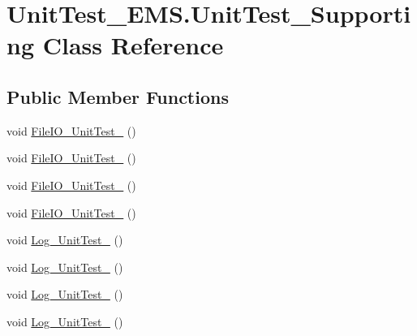 \hypertarget{class_unit_test___e_m_s_1_1_unit_test___supporting}{\section{Unit\-Test\-\_\-\-E\-M\-S.\-Unit\-Test\-\_\-\-Supporting Class Reference}
\label{class_unit_test___e_m_s_1_1_unit_test___supporting}
}
\subsection*{Public Member Functions}
\begin{DoxyCompactItemize}
\item 
void \hyperlink{class_unit_test___e_m_s_1_1_unit_test___supporting_a72211019064e1ba486f7f1fc700936d6}{File\-I\-O\-\_\-\-Unit\-Test\-\_} ()
\item 
void \hyperlink{class_unit_test___e_m_s_1_1_unit_test___supporting_ac55a01a9c7b6a2159bc66739143cae1a}{File\-I\-O\-\_\-\-Unit\-Test\-\_} ()
\item 
void \hyperlink{class_unit_test___e_m_s_1_1_unit_test___supporting_abb74bdd5723525afa1dbcfc1568cb8de}{File\-I\-O\-\_\-\-Unit\-Test\-\_} ()
\item 
void \hyperlink{class_unit_test___e_m_s_1_1_unit_test___supporting_a72d37bdf33fc43418c4d6570e5f23719}{File\-I\-O\-\_\-\-Unit\-Test\-\_} ()
\item 
void \hyperlink{class_unit_test___e_m_s_1_1_unit_test___supporting_af268ad94cc9b26f1f244f0792e6118de}{Log\-\_\-\-Unit\-Test\-\_} ()
\item 
void \hyperlink{class_unit_test___e_m_s_1_1_unit_test___supporting_a5114d1661979472dba5c59e96c07ce86}{Log\-\_\-\-Unit\-Test\-\_} ()
\item 
void \hyperlink{class_unit_test___e_m_s_1_1_unit_test___supporting_a3606d17041881ea7746454d51b07e159}{Log\-\_\-\-Unit\-Test\-\_} ()
\item 
void \hyperlink{class_unit_test___e_m_s_1_1_unit_test___supporting_a744cd71e0f61ff26153c3e91893a2370}{Log\-\_\-\-Unit\-Test\-\_} ()
\end{DoxyCompactItemize}


